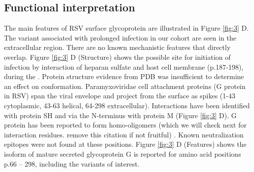 \documentclass{article} %
\begin{document}
\subsection{Functional interpretation}
The main features of RSV surface glycoprotein are illustrated in Figure \ref{fig:3} D.
The variant associated with prolonged infection in our cohort are seen in the extracellular region. 
There are no known mechanistic features that directly overlap. 
Figure \ref{fig:3} D (Structure) shows the possible site for  initiation of infection by interaction of heparan sulfate and host cell membrane (p.187-198), during the  \cite{levine1987demonstration, feldman1999identification, feldman2000fusion}.
Protein structure evidence from PDB was insufficient to determine an effect on conformation. 
Paramyxoviridae cell attachment proteins (G protein in RSV) span the viral envelope and project from the surface as spikes 
(1-43 cytoplasmic, 43-63 helical, 64-298 extracellular).
Interactions  have been identified with protein SH 
\cite{rixon2005respiratory} 
and via the N-terminus with protein M 
\cite{ghildyal2005interaction} (Figure \ref{fig:3} D).
G protein has been reported to form homo-oligomers (which we will check next for interaction residues. remove this citation if not fruitful)
\cite{collins1992oligomerization}.
Known neutralization epitopes were not found at these positions.
Figure \ref{fig:3} D (Features) shows the isoform of mature secreted glycoprotein G is reported for amino acid positions p.66 – 298, including the variants of interest.
\end{document}
